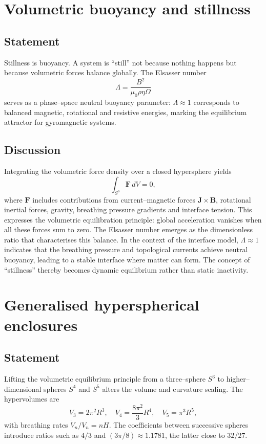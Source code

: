 \documentclass[12pt,a4paper]{article}
\begin{document}
\section{Volumetric buoyancy and stillness}
\label{sec:buoyancy}
\subsection{Statement}
Stillness is buoyancy.  A system is ``still'' not because nothing happens but because volumetric forces balance globally.  The Elsasser number
\[
\Lambda = \frac{B^2}{\mu_0 \rho \eta \Omega}
\]
serves as a phase–space neutral buoyancy parameter: $\Lambda \approx 1$ corresponds to balanced magnetic, rotational and resistive energies, marking the equilibrium attractor for gyromagnetic systems.

\subsection{Discussion}
Integrating the volumetric force density over a closed hypersphere yields
\[
\int_{S^3} \mathbf{F}\,dV = 0,
\]
where $\mathbf{F}$ includes contributions from current--magnetic forces $\mathbf{J}\times\mathbf{B}$, rotational inertial forces, gravity, breathing pressure gradients and interface tension.  This expresses the volumetric equilibration principle: global acceleration vanishes when all these forces sum to zero.  The Elsasser number emerges as the dimensionless ratio that characterises this balance.  In the context of the interface model, $\Lambda \approx 1$ indicates that the breathing pressure and topological currents achieve neutral buoyancy, leading to a stable interface where matter can form.  The concept of ``stillness'' thereby becomes dynamic equilibrium rather than static inactivity.

\section{Generalised hyperspherical enclosures}
\label{sec:general}
\subsection{Statement}
Lifting the volumetric equilibrium principle from a three–sphere $S^3$ to higher–dimensional spheres $S^4$ and $S^5$ alters the volume and curvature scaling.  The hypervolumes are
\[
V_3=2\pi^2 R^3, \quad V_4=\frac{8\pi^2}{3} R^4, \quad V_5=\pi^3 R^5,
\]
with breathing rates $\dot{V}_n/V_n = nH$.  The coefficients between successive spheres introduce ratios such as $4/3$ and $(3\pi/8)\approx 1.1781$, the latter close to $32/27$.
\end{document}
